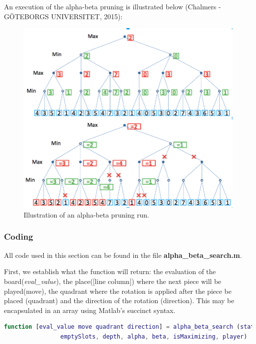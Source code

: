 \vspace{10pt}

An execution  of the alpha-beta pruning is illustrated below (Chalmers -
GÖTEBORGS UNIVERSITET, 2015):

\begin{figure}[h]
\centering
\includegraphics[scale=.75]{images/minmax}
\caption{Illustration of an alpha-beta pruning run.}
\label{fig:minmax}
\end{figure}

\FloatBarrier

\subsubsection{Coding}

All code used in this section can be found in the file
\textbf{alpha\_beta\_search.m}.

\vspace{10pt}

First, we establish what the function will return: the evaluation of the
board(\textit{eval\_value}), the place([line column]) where the next piece will
be played(move), the quadrant where the rotation is applied after the piece be
placed (quadrant) and the direction of the rotation (direction). This may be
encapsulated in an array using Matlab's succinct syntax.

\vspace{10pt}

\begin{lstlisting}[language=Matlab]
function [eval_value move quadrant direction] = alpha_beta_search (state_matrix, 
				emptySlots, depth, alpha, beta, isMaximizing, player)
\end{lstlisting}

